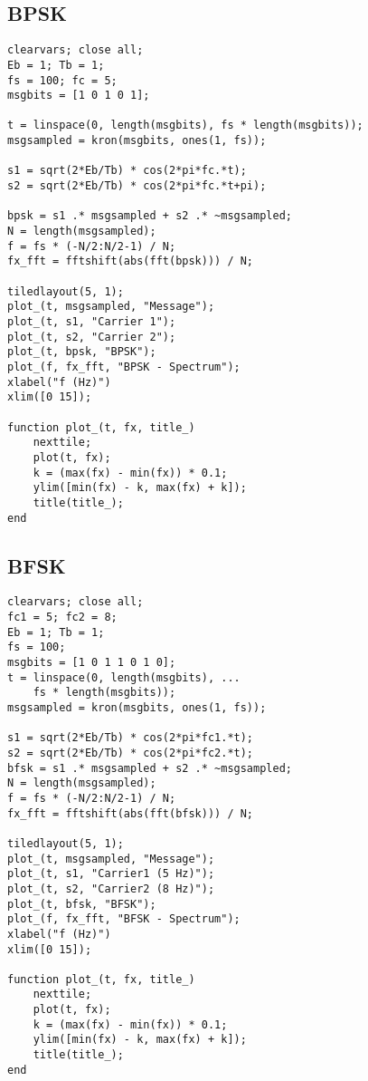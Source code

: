 \documentclass[12pt,a4paper]{article}
\begin{document}
\subsection{BPSK}
\begin{verbatim}
clearvars; close all;
Eb = 1; Tb = 1;
fs = 100; fc = 5;
msgbits = [1 0 1 0 1];

t = linspace(0, length(msgbits), fs * length(msgbits));
msgsampled = kron(msgbits, ones(1, fs));

s1 = sqrt(2*Eb/Tb) * cos(2*pi*fc.*t);
s2 = sqrt(2*Eb/Tb) * cos(2*pi*fc.*t+pi);

bpsk = s1 .* msgsampled + s2 .* ~msgsampled;
N = length(msgsampled);
f = fs * (-N/2:N/2-1) / N;
fx_fft = fftshift(abs(fft(bpsk))) / N;

tiledlayout(5, 1);
plot_(t, msgsampled, "Message");
plot_(t, s1, "Carrier 1");
plot_(t, s2, "Carrier 2");
plot_(t, bpsk, "BPSK");
plot_(f, fx_fft, "BPSK - Spectrum");
xlabel("f (Hz)")
xlim([0 15]);

function plot_(t, fx, title_)
    nexttile;
    plot(t, fx);
    k = (max(fx) - min(fx)) * 0.1;
    ylim([min(fx) - k, max(fx) + k]);
    title(title_);
end
\end{verbatim}
\subsection{BFSK}
\begin{verbatim}
clearvars; close all;
fc1 = 5; fc2 = 8;
Eb = 1; Tb = 1;
fs = 100;
msgbits = [1 0 1 1 0 1 0];
t = linspace(0, length(msgbits), ...
    fs * length(msgbits));
msgsampled = kron(msgbits, ones(1, fs));

s1 = sqrt(2*Eb/Tb) * cos(2*pi*fc1.*t);
s2 = sqrt(2*Eb/Tb) * cos(2*pi*fc2.*t);
bfsk = s1 .* msgsampled + s2 .* ~msgsampled;
N = length(msgsampled);
f = fs * (-N/2:N/2-1) / N;
fx_fft = fftshift(abs(fft(bfsk))) / N;

tiledlayout(5, 1);
plot_(t, msgsampled, "Message");
plot_(t, s1, "Carrier1 (5 Hz)");
plot_(t, s2, "Carrier2 (8 Hz)");
plot_(t, bfsk, "BFSK");
plot_(f, fx_fft, "BFSK - Spectrum");
xlabel("f (Hz)")
xlim([0 15]);

function plot_(t, fx, title_)
    nexttile;
    plot(t, fx);
    k = (max(fx) - min(fx)) * 0.1;
    ylim([min(fx) - k, max(fx) + k]);
    title(title_);
end
\end{verbatim}
\end{document}
